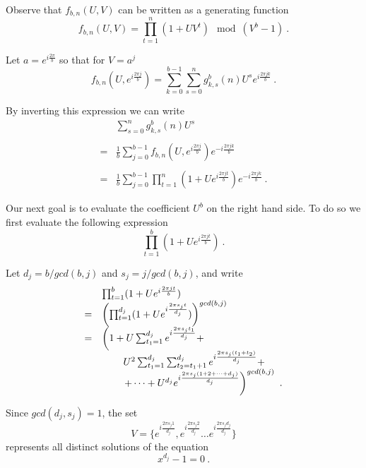 Observe that $f_{b,n}(U,V)$ can be written as a generating
function
\begin{equation}\label{eq1a}
f_{b,n}(U,V)= \prod_{t=1}^n (1+UV^t) \mod (V^b-1)~.
\end{equation}


Let $a=e^{i\frac{2\pi }{b}}$ so that for $V=a^j$
\begin{equation}\label{eq1b}
f_{b,n}(U,e^{i\frac{2\pi j}{b}})= \sum_{k=0}^{b-1} \sum_{s=0}^n
g^b_{k,s}(n)U^s e^{i\frac{2\pi jk}{b}}~.
\end{equation}

By inverting this expression we can write
\begin{equation}\label{eq1}
\begin{array}{lll}
&\sum_{s=0}^n g^b_{k,s}(n)U^s \\ \\=& \frac{1}{b}
\sum_{j=0}^{b-1}f_{b,n}(U,e^{i\frac{2\pi j}{b}}) e^{-i\frac{2\pi
jk}{b}}\\ \\=& \frac{1}{b} \sum_{j=0}^{b-1} \prod_{t=1}^n
(1+Ue^{i\frac{2\pi jt}{b}}) e^{-i\frac{2\pi jk}{b}}~.
\end{array}
\end{equation}

Our next goal is to evaluate the coefficient $U^b$ on the right
hand side. To do so we first evaluate the following expression
\begin{equation}
\prod_{t=1}^b (1+Ue^{i\frac{2\pi jt}{b}})~.
\end{equation}

Let $d_j=b/gcd(b,j)$ and $s_j=j/gcd(b,j)$, and write
\begin{equation}
\begin{array}{lll}
{}&\prod_{t=1}^b (1+Ue^{i\frac{2\pi jt}{b}})\\=&
\left(\prod_{t=1}^{d_j} (1+Ue^{i\frac{2\pi
s_j t}{d_j}})\right)^{gcd(b,j)}\\
=& \left( 1+ U\sum_{t_1=1}^{d_j} e^{i\frac{2\pi s_j t_1}{d_j}}+
\right.
\\{}&\hspace{0.3in}U^2\sum_{t_1=1}^{d_j}\sum_{t_2=t_1+1}^{d_j}
e^{i\frac{2\pi s_j(t_1+t_2)}{d_j}}
+\\{}&\left.\hspace{0.3in}+\dots + U^{d_j} e^{i\frac{2\pi s_j
(1+2+\dots+d_j)}{d_j}}\right)^{gcd(b,j)}~.
\end{array}
\end{equation}


Since $gcd(d_j,s_j)=1$, the set \[V=\{e^{i\frac{2\pi s_j 1}{d_j}},
e^{i\frac{2\pi s_j 2}{d_j}}\dots e^{i\frac{2\pi s_j d_j}{d_j}}\}\]
represents all distinct solutions of the equation
\begin{equation}\label{poly}
x^{d_j}-1=0~.
\end{equation}

